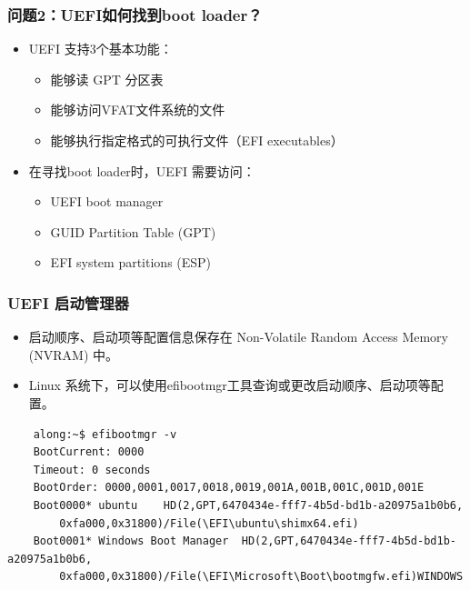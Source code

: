 \documentclass{beamer}
\begin{document}
\begin{frame}
    \frametitle{问题2：UEFI如何找到boot loader？}

    \begin{itemize}
        \item UEFI 支持3个基本功能：
        \begin{itemize}
            \item 能够读 GPT 分区表
            \item 能够访问VFAT文件系统的文件
            \item 能够执行指定格式的可执行文件（EFI executables）
        \end{itemize}
        \item 在寻找boot loader时，UEFI 需要访问：
        \begin{itemize}
            \item UEFI boot manager
            \item GUID Partition Table (GPT)
            \item EFI system partitions (ESP)
        \end{itemize}
    \end{itemize}


\end{frame}

\begin{frame}[fragile]
    \frametitle{UEFI 启动管理器}
    \begin{itemize}
        \item 启动顺序、启动项等配置信息保存在 Non-Volatile Random Access Memory (NVRAM) 中。
        \item Linux 系统下，可以使用efibootmgr工具查询或更改启动顺序、启动项等配置。
    \end{itemize}

    \scriptsize
    \begin{lstlisting}
    along:~$ efibootmgr -v
    BootCurrent: 0000
    Timeout: 0 seconds
    BootOrder: 0000,0001,0017,0018,0019,001A,001B,001C,001D,001E
    Boot0000* ubuntu    HD(2,GPT,6470434e-fff7-4b5d-bd1b-a20975a1b0b6,
        0xfa000,0x31800)/File(\EFI\ubuntu\shimx64.efi)
    Boot0001* Windows Boot Manager  HD(2,GPT,6470434e-fff7-4b5d-bd1b-a20975a1b0b6,
        0xfa000,0x31800)/File(\EFI\Microsoft\Boot\bootmgfw.efi)WINDOWS
    \end{lstlisting}
\end{frame}
\end{document}
